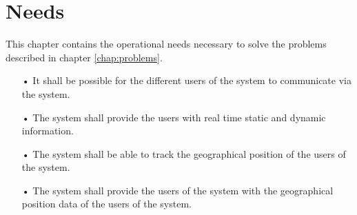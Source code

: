 \chapter{Needs}
This chapter contains the operational needs necessary to solve the problems described in chapter \ref{chap:problems}. 

\begin{enumerate}
\item[•] It shall be possible for the different users of the system to communicate via the system. 
\item[•] The system shall provide the users with real time static and dynamic information. 
\item[•] The system shall be able to track the geographical position of the users of the system. 
\item[•] The system shall provide the users of the system with the geographical position data of the users of the system. 
\end{enumerate}
